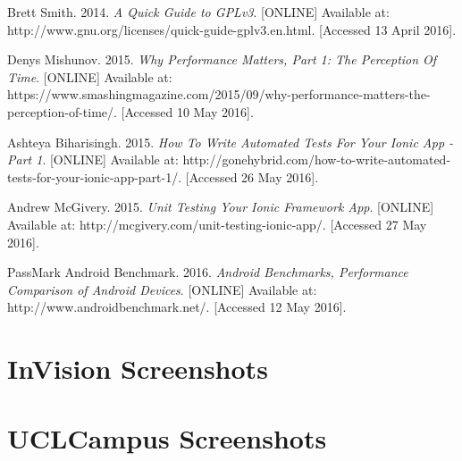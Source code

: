 \documentclass{eplmastersthesis}
\begin{document}
\begin{thebibliography}{9}
\bibitem{} 
Brett Smith. 2014.
\textit{A Quick Guide to GPLv3}. 
[ONLINE] Available at: http://www.gnu.org/licenses/quick-guide-gplv3.en.html. [Accessed 13 April 2016].

\bibitem{}
Denys Mishunov. 2015.
\textit{Why Performance Matters, Part 1: The Perception Of Time}. 
[ONLINE] Available at: https://www.smashingmagazine.com/2015/09/why-performance-matters-the-perception-of-time/. [Accessed 10 May 2016].

\newpage

\bibitem{}
Ashteya Biharisingh. 2015. 
\textit{How To Write Automated Tests For Your Ionic App - Part 1}. 
[ONLINE] Available at: http://gonehybrid.com/how-to-write-automated-tests-for-your-ionic-app-part-1/. [Accessed 26 May 2016].


\bibitem{}
Andrew McGivery. 2015.
\textit{Unit Testing Your Ionic Framework App}. 
[ONLINE] Available at: http://mcgivery.com/unit-testing-ionic-app/. [Accessed 27 May 2016].

\bibitem{}
PassMark Android Benchmark. 2016. 
\textit{Android Benchmarks, Performance Comparison of Android Devices}. 
[ONLINE] Available at: http://www.androidbenchmark.net/. [Accessed 12 May 2016].
\end{thebibliography}
\newpage

\appendix
\chapter{InVision Screenshots}
\chapter{UCLCampus Screenshots}
\end{document}
